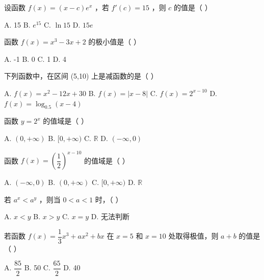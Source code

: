 \documentclass[11pt, a4paper]{article}
\begin{document}
\begin{baitap}[6]
设函数 $f(x) = (x - c)e^x$ ，若 $f'(c) = 15$ ，则 $c$ 的值是（ ）
\par\vspace{3pt}
\noindent A. 15 \quad B. $e^{15}$ \quad C. $\ln 15$ \quad D. $15e$
\end{baitap}

\begin{baitap}[7]
函数 $f(x) = x^3 - 3x + 2$ 的极小值是（ ）
\par\vspace{3pt}
\noindent A. -1 \quad B. 0 \quad C. 1 \quad D. 4
\end{baitap}

\begin{baitap}[8]
下列函数中，在区间 (5,10) 上是减函数的是（ ）
\par\vspace{3pt}
\noindent A. $f(x) = x^2 - 12x + 30$ \quad B. $f(x) = |x - 8|$ \quad C. $f(x) = 2^{x-10}$ \quad D. $f(x) = \log_{0.5}(x - 4)$
\end{baitap}

\begin{baitap}[9]
函数 $y = 2^x$ 的值域是（ ）
\par\vspace{3pt}
\noindent A. $(0, +\infty)$ \quad B. $[0, +\infty)$ \quad C. $\mathbb{R}$ \quad D. $(-\infty, 0)$
\end{baitap}

\begin{baitap}[10]
函数 $f(x) = \left(\dfrac{1}{2}\right)^{x-10}$ 的值域是（ ）
\par\vspace{3pt}
\noindent A. $(-\infty, 0)$ \quad B. $(0, +\infty)$ \quad C. $[0, +\infty)$ \quad D. $\mathbb{R}$
\end{baitap}

\begin{baitap}[11]
若 $a^x < a^y$ ，则当 $0 < a < 1$ 时，（ ）
\par\vspace{3pt}
\noindent A. $x < y$ \quad B. $x > y$ \quad C. $x = y$ \quad D. 无法判断
\end{baitap}

\begin{baitap}[12]
若函数 $f(x) = \dfrac{1}{3}x^3 + ax^2 + bx$ 在 $x = 5$ 和 $x = 10$ 处取得极值，则 $a + b$ 的值是（ ）
\par\vspace{3pt}
\noindent A. $\dfrac{85}{2}$ \quad B. 50 \quad C. $\dfrac{65}{2}$ \quad D. 40
\end{baitap}
\end{document}
